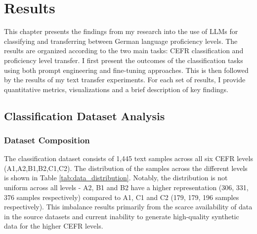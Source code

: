 \chapter{Results}
\label{ch:results}
This chapter presents the findings from my research into the use of LLMs for classifying and transferring between German language proficiency levels. The results are organized according to the two main tasks: CEFR classification and proficiency level transfer. I first present the outcomes of the classification tasks using both prompt engineering and fine-tuning approaches. This is then followed by the results of my text transfer experiments. For each set of results, I provide quantitative metrics, visualizations and a brief description of key findings.

\section{Classification Dataset Analysis}
\label{s:classification_dataset_analysis}
\subsection*{Dataset Composition}
\label{ss:dataset_composition}
The classification dataset consists of 1,445 text samples across all six CEFR levels (A1,A2,B1,B2,C1,C2). The distribution of the samples across the different levels is shown in Table \ref{tab:data_distribution}. Notably, the distribution is not uniform across all levels - A2, B1 and B2 have a higher representation (306, 331, 376 samples respectively) compared to A1, C1 and C2 (179, 179, 196 samples respectively). This imbalance results primarily from the scarce availability of data in the source datasets and current inability to generate high-quality synthetic data for the higher CEFR levels.
